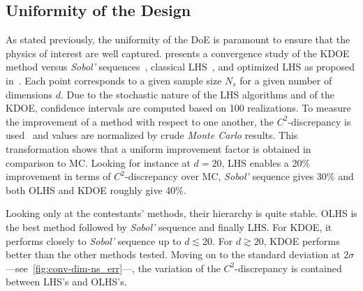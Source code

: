 \subsection{Uniformity of the Design}
As stated previously, the uniformity of the DoE is paramount to ensure that the physics of interest are well captured.  presents a convergence study of the KDOE method versus \emph{Sobol'} sequences~\citep{Sobol1967}, classical LHS~\citep{Mckay1979}, and optimized LHS as proposed in~\citep{Baudin2015}. Each point corresponds to a given sample size $N_s$ for a given number of dimensions $d$. Due to the stochastic nature of the LHS algorithms and of the KDOE, confidence intervals are computed based on 100 realizations. To measure the improvement of a method with respect to one another, the $C^2$-discrepancy is used~\citep{Fang2006,Androulakis2016} and values are normalized by crude \emph{Monte Carlo} results. This transformation shows that a uniform improvement factor is obtained in comparison to MC. Looking for instance at $d = 20$, LHS enables a 20\% improvement in terms of $C^2$-discrepancy over MC, \emph{Sobol'} sequence gives 30\% and both OLHS and KDOE roughly give 40\%.

Looking only at the contestants' methods, their hierarchy is quite stable. OLHS is the best method followed by \emph{Sobol'} sequence and finally LHS. For KDOE, it performs closely to \emph{Sobol'} sequence up to $d \lesssim 20$. For $d \gtrsim 20$, KDOE performs better than the other methods tested. Moving on to the standard deviation at $2\sigma$ ---\thinspace see~\cref{fig:conv-dim-ns_err}\thinspace---, the variation of the $C^2$-discrepancy is contained between LHS’s and OLHS’s.

